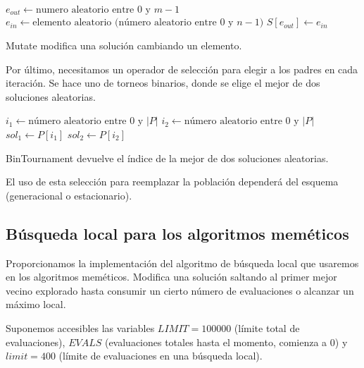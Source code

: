 \documentclass{article}
\begin{document}
\begin{algorithm}[H]
	\DontPrintSemicolon %
	$e_{out}\gets\text{numero aleatorio entre $0$ y $m-1$}$ 
	$e_{in}\gets\text{elemento aleatorio (número aleatorio entre $0$ y $n-1$)}$\;
	$S[e_{out}]\gets e_{in}$
	\caption{{\sc Mutate} modifica una solución cambiando un elemento.}
	\label{alg:mutate}
\end{algorithm}

Por último, necesitamos un operador de selección para elegir a los padres en cada iteración. Se hace uno de torneos binarios, donde se elige el mejor de dos soluciones aleatorias.

\begin{algorithm}[H]
	\DontPrintSemicolon %
	$i_1\gets\text{número aleatorio entre 0 y $|P|$}$\;
	$i_2\gets\text{número aleatorio entre 0 y $|P|$}$\;
	$sol_1\gets P[i_1]$\;
	$sol_2\gets P[i_2]$\;
	\caption{{\sc BinTournament} devuelve el índice de la mejor de dos soluciones aleatorias.}
	\label{alg:bin-tournament}
\end{algorithm}

El uso de esta selección para reemplazar la población dependerá del esquema (generacional o estacionario).

\subsection{Búsqueda local para los algoritmos meméticos}

Proporcionamos la implementación del algoritmo de búsqueda local que usaremos en los algoritmos meméticos. Modifica una solución
saltando al primer mejor vecino explorado hasta consumir un cierto número de evaluaciones o alcanzar un máximo local.

Suponemos accesibles las variables $LIMIT=100000$ (límite total de evaluaciones), $EVALS$ (evaluaciones totales hasta el momento, comienza
a 0)
y $limit=400$ (límite de evaluaciones en una búsqueda local).
\end{document}
